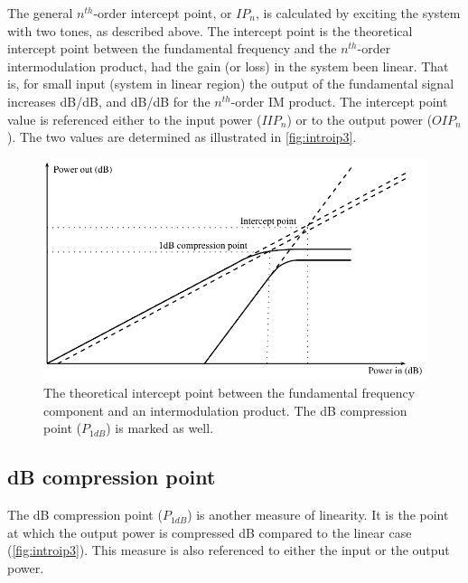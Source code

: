 			The general $n^{th}$-order intercept point, or $IP_n$, is calculated by exciting the system with two tones, as described above. The intercept point is the theoretical intercept point between the fundamental frequency and the $n^{th}$-order intermodulation product, had the gain (or loss) in the system been linear.\autocite{bahl03,pozar90} That is, for small input (system in linear region) the output of the fundamental signal increases \unit[1]{dB/dB}, and \unit[n]{dB/dB} for the $n^{th}$-order IM product. %
			The intercept point value is referenced either to the input power ($IIP_n$) or to the output power ($OIP_n$). The two values are determined as illustrated in \autoref{fig:introip3}.

			\begin{figure}[hbt!]
			\centering
			\includegraphics[width=1\textwidth]{fig/introduction/ip3.pdf}
			\caption[Definition of $n^{th}$-order intercept point and 1 dB compression point.]{The theoretical intercept point between the fundamental frequency component and an intermodulation product. The \unit[1]{dB} compression point ($P_{1dB}$) is marked as well.}\label{fig:introip3}
			\end{figure}

		\subsection{\unit[1]{dB} compression point}\label{sec:p1db}
			The \unit[1]{dB} compression point ($P_{1dB}$) is another measure of linearity. It is the point at which the output power is compressed \unit[1]{dB} compared to the linear case (\autoref{fig:introip3}). This measure is also referenced to either the input or the output power.

